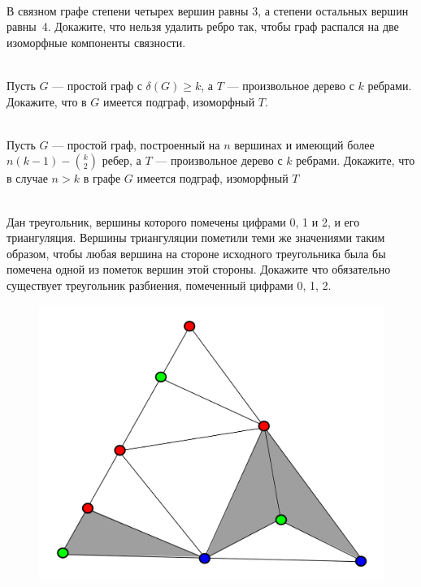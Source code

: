 \documentclass[a4paper,12pt,twoside]{article}
\begin{document}
\begin{?}[Разминочная]\ \\
    В связном графе степени четырех вершин равны 3, а степени остальных вершин равны~4. Докажите, что нельзя удалить ребро так, чтобы граф распался на две изоморфные компоненты связности.
\end{?}
\begin{?}\ \\
    Пусть $G$ --- простой граф с $\delta(G)\geq k$, а $T$ --- произвольное дерево с $k$ ребрами. Докажите, что в $G$ имеется подграф, изоморфный $T$.
\end{?}
\begin{?}\ \\
    Пусть $G$ --- простой граф, построенный на $n$ вершинах и имеющий более $n(k -1) - \binom{k}{2}$ ребер, а $T$ --- произвольное дерево с $k$ ребрами. Докажите, что в случае $n > k$ в графе $G$ имеется подграф, изоморфный $T$
\end{?}
\begin{?}\ \\ 
    Дан треугольник, вершины которого помечены цифрами 0, 1 и 2, и его триангуляция. Вершины триангуляции пометили теми же значениями таким образом, чтобы любая вершина на стороне исходного треугольника была бы помечена одной из пометок вершин этой стороны. Докажите что обязательно существует треугольник разбиения, помеченный цифрами 0, 1, 2. 
    
    \begin{figure}[h!]
        \begin{center}
            \includegraphics[scale=0.1]{images/homeworks-01-sperner}
        \end{center}
    \end{figure}
\end{?}
\end{document}
